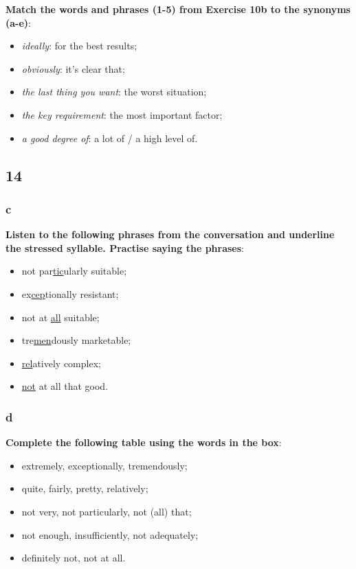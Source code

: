 \textbf{Match the words and phrases (1-5) from Exercise 10b to the synonyms (a-e)}:

\begin{itemize}

\item \textit{ideally}: for the best results;
\item \textit{obviously}: it's clear that;
\item \textit{the last thing you want}: the worst situation;
\item \textit{the key requirement}: the most important factor;
\item \textit{a good degree of}: a lot of / a high level of.

\end{itemize}

\subsection{14}

\subsubsection{c}

\textbf{Listen to the following phrases from the conversation and underline the stressed syllable. Practise saying the phrases}:

\begin{itemize}

\item not par\underline{tic}ularly suitable;
\item ex\underline{cep}tionally resistant;
\item not at \underline{all} suitable; 
\item tre\underline{men}dously marketable;
\item \underline{rel}atively complex;
\item \underline{not} at all that good.

\end{itemize}

\subsubsection{d}

\textbf{Complete the following table using the words in the box}:

\begin{itemize}

\item extremely, exceptionally, tremendously;
\item quite, fairly, pretty, relatively;
\item not very, not particularly, not (all) that;
\item not enough, insufficiently, not adequately;
\item definitely not, not at all.

\end{itemize} 

